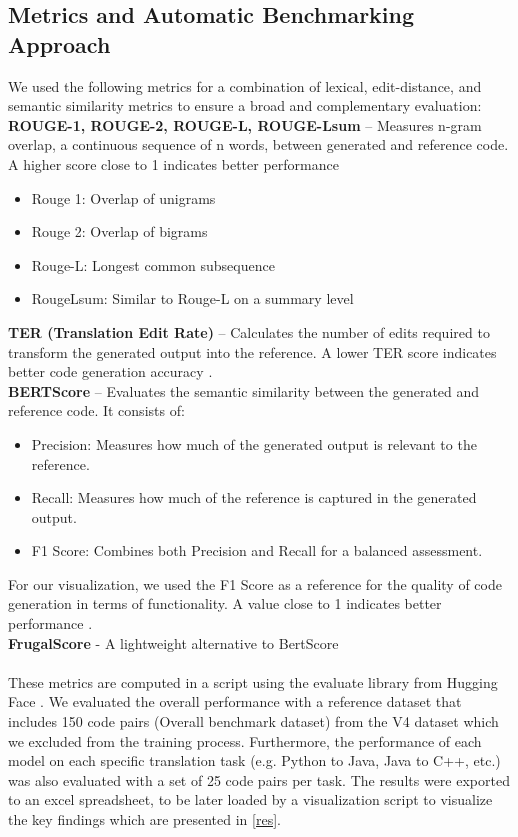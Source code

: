 \documentclass[conference]{IEEEtran}
\begin{document}
\subsection{Metrics and Automatic Benchmarking Approach}
We used the following metrics for a combination of lexical, edit-distance, and semantic similarity metrics to ensure a broad and complementary evaluation:
\\
\textbf{ROUGE-1, ROUGE-2, ROUGE-L, ROUGE-Lsum} – Measures n-gram overlap, a continuous sequence of n words, between generated and reference code. A higher score close to 1 indicates better performance
    \begin{itemize}
        \item Rouge 1: Overlap of unigrams
        \item Rouge 2: Overlap of bigrams
        \item Rouge-L: Longest common subsequence
        \item RougeLsum: Similar to Rouge-L on a summary level
    \end{itemize}
\textbf{TER (Translation Edit Rate)} – Calculates the number of edits required to transform the generated output into the reference. A lower TER score indicates better code generation accuracy \cite{b14}.
\\
\textbf{BERTScore} – Evaluates the semantic similarity between the generated and reference code. It consists of:  
\begin{itemize}
    \item  Precision: Measures how much of the generated output is relevant to the reference.  
    \item  Recall: Measures how much of the reference is captured in the generated output.  
    \item F1 Score: Combines both Precision and Recall for a balanced assessment. 
\end{itemize}
For our visualization, we used the F1 Score as a reference for the quality of code generation in terms of functionality. A value close to 1 indicates better performance \cite{b15}.
\\
\textbf{FrugalScore} - A lightweight alternative to BertScore
\\\\
These metrics are computed in a script using the evaluate library from Hugging Face \cite{b16}. We evaluated the overall performance with a reference dataset that includes 150 code pairs (Overall benchmark dataset) from the V4 dataset which we excluded from the training process. Furthermore, the performance of each model on each specific translation task (e.g. Python to Java, Java to C++, etc.) was also evaluated with a set of 25 code pairs per task. The results were exported to an excel spreadsheet, to be later loaded by a visualization script to visualize the key findings which are presented in \ref{res}.
\end{document}
